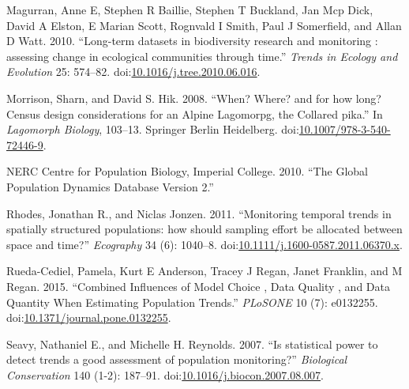 \documentclass[11pt,]{article}
\begin{document}
\hypertarget{ref-Magurran2010}{}
Magurran, Anne E, Stephen R Baillie, Stephen T Buckland, Jan Mcp Dick,
David A Elston, E Marian Scott, Rognvald I Smith, Paul J Somerfield, and
Allan D Watt. 2010. ``Long-term datasets in biodiversity research and
monitoring : assessing change in ecological communities through time.''
\emph{Trends in Ecology and Evolution} 25: 574--82.
doi:\href{https://doi.org/10.1016/j.tree.2010.06.016}{10.1016/j.tree.2010.06.016}.

\hypertarget{ref-Morrison2008}{}
Morrison, Sharn, and David S. Hik. 2008. ``When? Where? and for how
long? Census design considerations for an Alpine Lagomorpg, the Collared
pika.'' In \emph{Lagomorph Biology}, 103--13. Springer Berlin
Heidelberg.
doi:\href{https://doi.org/10.1007/978-3-540-72446-9}{10.1007/978-3-540-72446-9}.

\hypertarget{ref-GPDD2010}{}
NERC Centre for Population Biology, Imperial College. 2010. ``The Global
Population Dynamics Database Version 2.''

\hypertarget{ref-Rhodes2011}{}
Rhodes, Jonathan R., and Niclas Jonzen. 2011. ``Monitoring temporal
trends in spatially structured populations: how should sampling effort
be allocated between space and time?'' \emph{Ecography} 34 (6): 1040--8.
doi:\href{https://doi.org/10.1111/j.1600-0587.2011.06370.x}{10.1111/j.1600-0587.2011.06370.x}.

\hypertarget{ref-Rueda-Cediel2015}{}
Rueda-Cediel, Pamela, Kurt E Anderson, Tracey J Regan, Janet Franklin,
and M Regan. 2015. ``Combined Influences of Model Choice , Data Quality
, and Data Quantity When Estimating Population Trends.'' \emph{PLoSONE}
10 (7): e0132255.
doi:\href{https://doi.org/10.1371/journal.pone.0132255}{10.1371/journal.pone.0132255}.

\hypertarget{ref-Seavy2007}{}
Seavy, Nathaniel E., and Michelle H. Reynolds. 2007. ``Is statistical
power to detect trends a good assessment of population monitoring?''
\emph{Biological Conservation} 140 (1-2): 187--91.
doi:\href{https://doi.org/10.1016/j.biocon.2007.08.007}{10.1016/j.biocon.2007.08.007}.
\end{document}
